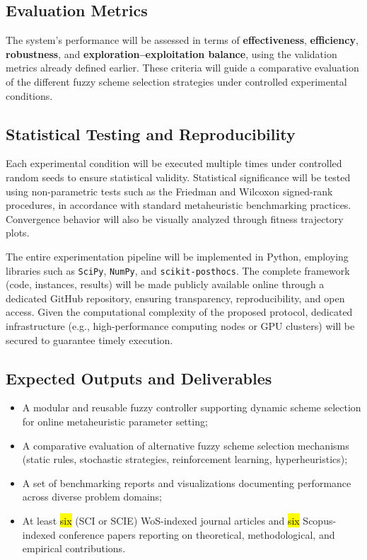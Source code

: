 \subsection{Evaluation Metrics}
The system’s performance will be assessed in terms of \textbf{effectiveness}, \textbf{efficiency}, \textbf{robustness}, and \textbf{exploration–exploitation balance}, using the validation metrics already defined earlier. These criteria will guide a comparative evaluation of the different fuzzy scheme selection strategies under controlled experimental conditions.

\subsection{Statistical Testing and Reproducibility}
Each experimental condition will be executed multiple times under controlled random seeds to ensure statistical validity. Statistical significance will be tested using non-parametric tests such as the Friedman and Wilcoxon signed-rank procedures, in accordance with standard metaheuristic benchmarking practices. Convergence behavior will also be visually analyzed through fitness trajectory plots.

The entire experimentation pipeline will be implemented in Python, employing libraries such as \texttt{SciPy}, \texttt{NumPy}, and \texttt{scikit-posthocs}. The complete framework (code, instances, results) will be made publicly available online through a dedicated GitHub repository, ensuring transparency, reproducibility, and open access. Given the computational complexity of the proposed protocol, dedicated infrastructure (e.g., high-performance computing nodes or GPU clusters) will be secured to guarantee timely execution.

\subsection{Expected Outputs and Deliverables}
\begin{itemize}
    \item A modular and reusable fuzzy controller supporting dynamic scheme selection for online metaheuristic parameter setting;
    \item A comparative evaluation of alternative fuzzy scheme selection mechanisms (static rules, stochastic strategies, reinforcement learning, hyperheuristics);
    \item A set of benchmarking reports and visualizations documenting performance across diverse problem domains;
    \item At least \hl{six} (SCI or SCIE) WoS-indexed journal articles and \hl{six} Scopus-indexed conference papers reporting on theoretical, methodological, and empirical contributions.
\end{itemize}

